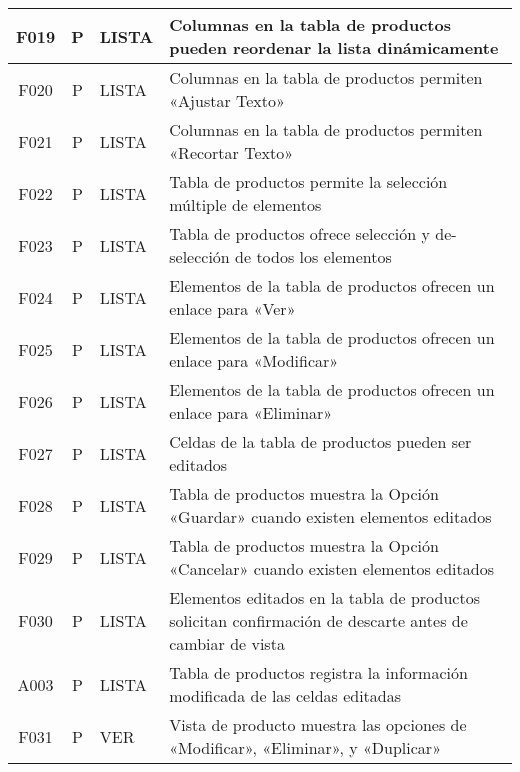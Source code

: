 \begin{landscape}
{\begin{longtable}[htb]{|c|c|p{3.8cm}|p{15.2cm}|}
\scriptsize{F019} & \scriptsize{P} & \scriptsize{LISTA} & \scriptsize{Columnas en la tabla de productos pueden reordenar la lista dinámicamente} \\ \hline
\scriptsize{F020} & \scriptsize{P} & \scriptsize{LISTA} & \scriptsize{Columnas en la tabla de productos permiten «Ajustar Texto»} \\ \hline
\scriptsize{F021} & \scriptsize{P} & \scriptsize{LISTA} & \scriptsize{Columnas en la tabla de productos permiten «Recortar Texto»} \\ \hline
\scriptsize{F022} & \scriptsize{P} & \scriptsize{LISTA} & \scriptsize{Tabla de productos permite la selección múltiple de elementos} \\ \hline
\scriptsize{F023} & \scriptsize{P} & \scriptsize{LISTA} & \scriptsize{Tabla de productos ofrece selección y de-selección de todos los elementos} \\ \hline
\scriptsize{F024} & \scriptsize{P} & \scriptsize{LISTA} & \scriptsize{Elementos de la tabla de productos ofrecen un enlace para «Ver»} \\ \hline
\scriptsize{F025} & \scriptsize{P} & \scriptsize{LISTA} & \scriptsize{Elementos de la tabla de productos ofrecen un enlace para «Modificar»} \\ \hline
\scriptsize{F026} & \scriptsize{P} & \scriptsize{LISTA} & \scriptsize{Elementos de la tabla de productos ofrecen un enlace para «Eliminar»} \\ \hline
\scriptsize{F027} & \scriptsize{P} & \scriptsize{LISTA} & \scriptsize{Celdas de la tabla de productos pueden ser editados} \\ \hline
\scriptsize{F028} & \scriptsize{P} & \scriptsize{LISTA} & \scriptsize{Tabla de productos muestra la Opción «Guardar» cuando existen elementos editados} \\ \hline
\scriptsize{F029} & \scriptsize{P} & \scriptsize{LISTA} & \scriptsize{Tabla de productos muestra la Opción «Cancelar» cuando existen elementos editados} \\ \hline
\scriptsize{F030} & \scriptsize{P} & \scriptsize{LISTA} & \scriptsize{Elementos editados en la tabla de productos solicitan confirmación de descarte antes de cambiar de vista} \\ \hline
\scriptsize{A003} & \scriptsize{P} & \scriptsize{LISTA} & \scriptsize{Tabla de productos registra la información modificada de las celdas editadas} \\ \hline
\scriptsize{F031} & \scriptsize{P} & \scriptsize{VER} & \scriptsize{Vista de producto muestra las opciones de «Modificar», «Eliminar», y «Duplicar»} \\ \hline

\end{longtable}}
\end{landscape}
